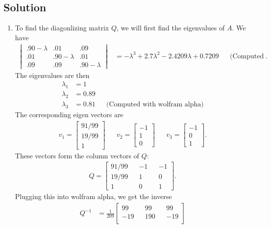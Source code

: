 \documentclass[10pt,a4paper]{article}
\theoremstyle{definition}
\begin{document}
\subsection*{Solution}
\begin{enumerate}
\item To find the diagonlizing matrix $Q$, we will first find the eigenvalues of $A$. We have
\begin{align*}
\begin{vmatrix}
.90 - \lambda &.01 &.09\\
.01 &.90 - \lambda &.01\\
.09 &.09 &.90 - \lambda
\end{vmatrix} &= -\lambda^{3} + 2.7 \lambda^2 - 2.4209 \lambda + 0.7209 && \text{(Computed with wolfram alpha)}.
\end{align*}
The eigenvalues are then 
\begin{align*}
\lambda_1 &= 1\\
\lambda_2 &= 0.89\\
\lambda_3 &= 0.81 && \text{(Computed with wolfram alpha)}
\end{align*}
The corresponding eigen vectors are
\begin{align*}
v_1 = \begin{bmatrix}
91/99\\
19/99\\
1
\end{bmatrix}  && v_2 = \begin{bmatrix}
-1\\
1\\
0
\end{bmatrix} && v_3 = \begin{bmatrix}
-1\\
0\\
1
\end{bmatrix}.
\end{align*}
These vectors form the column vectors of $Q$:
\begin{align*}
Q = \begin{bmatrix}
91/99 && -1 && -1\\
19/99 && 1 && 0\\
1 && 0 && 1
\end{bmatrix}.
\end{align*}
Plugging this into wolfram alpha, we get the inverse
\begin{align*}
Q^{-1} &= \frac{1}{209} \begin{bmatrix}
99 && 99 && 99\\
-19 && 190 && -19\\

\end{bmatrix}
\end{align*}
\end{enumerate}
\end{document}
